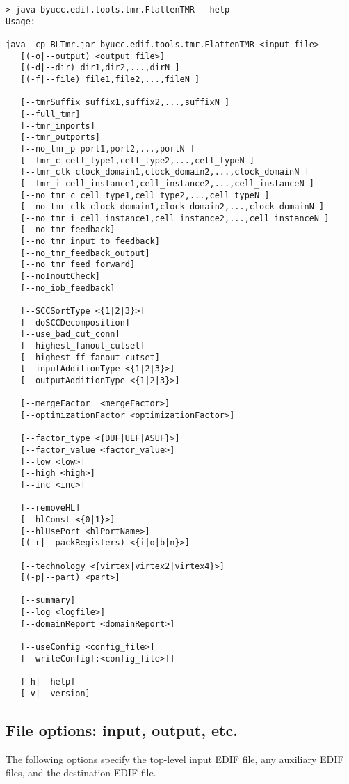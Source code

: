 \documentclass[english]{article}
\begin{document}
\begin{verbatim}
> java byucc.edif.tools.tmr.FlattenTMR --help
Usage:

java -cp BLTmr.jar byucc.edif.tools.tmr.FlattenTMR <input_file>
   [(-o|--output) <output_file>]
   [(-d|--dir) dir1,dir2,...,dirN ]
   [(-f|--file) file1,file2,...,fileN ]

   [--tmrSuffix suffix1,suffix2,...,suffixN ]
   [--full_tmr]
   [--tmr_inports]
   [--tmr_outports]
   [--no_tmr_p port1,port2,...,portN ]
   [--tmr_c cell_type1,cell_type2,...,cell_typeN ]
   [--tmr_clk clock_domain1,clock_domain2,...,clock_domainN ]
   [--tmr_i cell_instance1,cell_instance2,...,cell_instanceN ]
   [--no_tmr_c cell_type1,cell_type2,...,cell_typeN ]
   [--no_tmr_clk clock_domain1,clock_domain2,...,clock_domainN ]
   [--no_tmr_i cell_instance1,cell_instance2,...,cell_instanceN ]
   [--no_tmr_feedback]
   [--no_tmr_input_to_feedback]
   [--no_tmr_feedback_output]
   [--no_tmr_feed_forward]
   [--noInoutCheck]
   [--no_iob_feedback]

   [--SCCSortType <{1|2|3}>]
   [--doSCCDecomposition]
   [--use_bad_cut_conn]
   [--highest_fanout_cutset]
   [--highest_ff_fanout_cutset]
   [--inputAdditionType <{1|2|3}>]
   [--outputAdditionType <{1|2|3}>]

   [--mergeFactor  <mergeFactor>]
   [--optimizationFactor <optimizationFactor>]

   [--factor_type <{DUF|UEF|ASUF}>]
   [--factor_value <factor_value>]
   [--low <low>]
   [--high <high>]
   [--inc <inc>]

   [--removeHL]
   [--hlConst <{0|1}>]
   [--hlUsePort <hlPortName>]
   [(-r|--packRegisters) <{i|o|b|n}>]

   [--technology <{virtex|virtex2|virtex4}>]
   [(-p|--part) <part>]

   [--summary]
   [--log <logfile>]
   [--domainReport <domainReport>]

   [--useConfig <config_file>]
   [--writeConfig[:<config_file>]]

   [-h|--help]
   [-v|--version]
\end{verbatim}

\subsection{File options: input, output, etc.}
The following options specify the top-level input EDIF file, any auxiliary EDIF
files, and the destination EDIF file.
\end{document}
